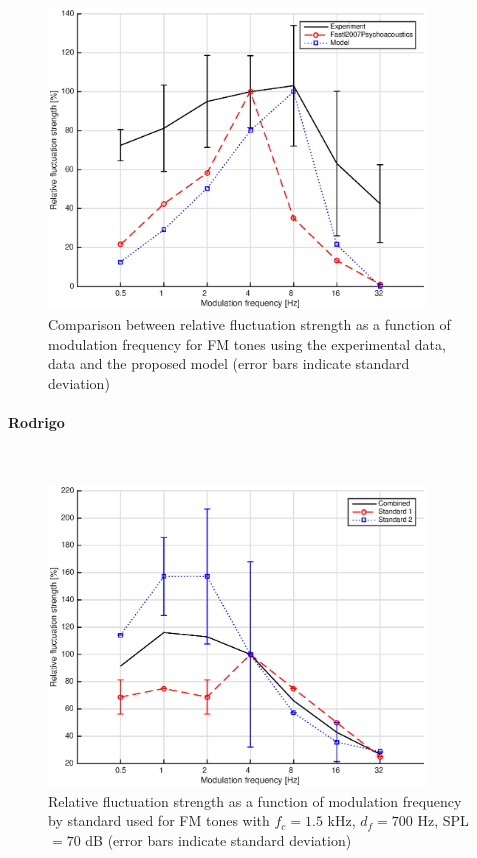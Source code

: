 \documentclass[a4paper]{article}
\begin{document}
\begin{figure}[H]
    \centering
    \includegraphics[height=8cm]{img/FM_tones-fm-results-AO-comparison}
    \caption{Comparison between relative fluctuation strength as a function of
        modulation frequency for FM tones using the experimental data,
        \citeauthor{Fastl2007Psychoacoustics} data and the proposed model
        (error bars indicate standard deviation)}
\end{figure}

\paragraph{Rodrigo} ~\\

\begin{figure}[H]
    \centering
    \includegraphics[height=8cm]{img/FM_tones-fm-results-Rodrigo-standards}
    \caption{Relative fluctuation strength as a function of modulation
        frequency by standard used for FM tones with $f_c = 1.5$ kHz,
        $d_f = 700$ Hz, SPL $= 70$ dB (error bars indicate standard deviation)}
\end{figure}
\end{document}
